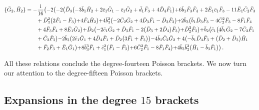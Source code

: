 \documentclass[10pt]{amsart}
\theoremstyle{definition}
\theoremstyle{corollary}
\theoremstyle{remark}
\theoremstyle{conclusion}
\begin{document}
\begin{align}
\{\bar{G}_2,\bar{H}_2\}&=-\frac{{\rm i}}{16}  \bigl(-2 \bigl(-2 \bigl(\bar{D}_3 \bigl(-3 \bar{b}_1 \bar{H}_2+2 \bar{c}_1 \bar{G}_1-\bar{c}_1 \bar{G}_2+\bar{d}_1 \bar{F}_3+4 \bar{D}_4 \bar{F}_1\bigl)+6 \bar{b}_1 \bar{F}_3 \bar{F}_4+2 \bar{E}_1 \bar{c}_1 \bar{F}_3-11 \bar{E}_1 \bar{C}_2 \bar{F}_3 \nonumber \\
& \hskip 0.7cm+\bar{D}_3^2 \bigl(2 \bar{F}_1-\bar{F}_3\bigl)+4 \bar{F}_4 \bar{H}_2\bigl)+4 \bar{b}_3^2 \bigl(-2 \bar{C}_2 \bar{G}_2+4 \bar{D}_3 \bar{F}_1-\bar{D}_3 \bar{F}_3\bigl)+2 \bar{b}_3 \bigl(\bar{b}_1 \bar{D}_3 \bar{F}_3-4 \bar{C}_2^2 \bar{F}_3-8 \bar{F}_1 \bar{F}_4 \nonumber \\
& \hskip 0.7cm+4 \bar{F}_3 \bar{F}_4+8 \bar{E}_1 \bar{G}_2\bigl)+\bar{D}_2 \bigl(-2 \bar{c}_1 \bar{G}_2+\bar{D}_3 \bar{F}_1-2 \bigl(\bar{D}_3+2 \bar{D}_4\bigl) \bar{F}_3\bigl)+\bar{D}_2^2 \bar{F}_3\bigl)+\bar{b}_2 \bigl(\bar{c}_1 \bigl(4 \bar{b}_1 \bar{G}_2-7 \bar{C}_2 \bar{F}_1 \nonumber \\
& \hskip 0.7cm+\bar{C}_2 \bar{F}_3\bigl)-2 \bar{b}_3 \bigl(2 \bar{c}_1 \bar{G}_1+4 \bar{D}_4 \bar{F}_1+\bar{D}_2 \bigl(3 \bar{F}_1+\bar{F}_3\bigl)\bigl)-4 \bar{b}_1 \bar{C}_2 \bar{G}_2+4 \bigl(-\bar{b}_1 \bar{D}_4 \bar{F}_3+\bigl(\bar{D}_2+\bar{D}_3\bigl) \bar{H}_1\nonumber \\
& \hskip 0.7cm+\bar{F}_2 \bar{F}_3+\bar{E}_1\bar{G}_1\bigl)+8 \bar{b}_3^3 \bar{F}_1+\bar{c}_1^2 \bigl(\bar{F}_1-\bar{F}_3\bigl)+6 \bar{C}_2^2 \bar{F}_1-8 \bar{F}_1 \bar{F}_4\bigl)+4 \bar{b}_3 \bar{b}_2^2 \bigl(\bar{H}_1-\bar{b}_3 \bar{F}_1\bigl)\bigl) \, .
\end{align} 

All these relations conclude the degree-fourteen Poisson brackets. We now turn our attention to the degree-fifteen Poisson brackets. 

\subsection{Expansions in the degree $15$ brackets}
\end{document}
